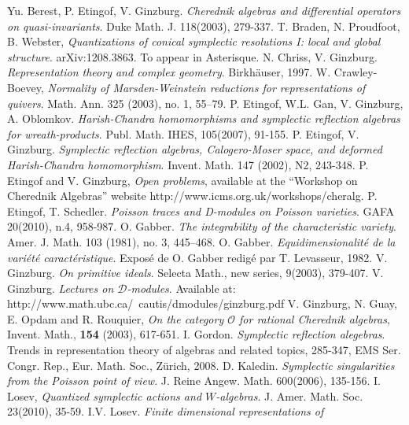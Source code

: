 \documentclass[12pt]{amsart}
\theoremstyle{definition}
\begin{document}
\begin{thebibliography}{99}
 Yu. Berest, P. Etingof, V. Ginzburg. {\it Cherednik algebras
and differential operators on quasi-invariants}.  Duke Math. J. 118(2003),  279-337.
 T. Braden, N. Proudfoot, B. Webster, {\it Quantizations of conical symplectic resolutions I: local and global structure}. arXiv:1208.3863. To appear in Asterisque.
 N. Chriss, V. Ginzburg. {\it Representation theory and complex geometry}.
Birkh\"{a}user, 1997.
 W. Crawley-Boevey, {\it Normality of Marsden-Weinstein reductions for representations of quivers}. Math. Ann.  325  (2003),  no. 1, 55–79.
 P. Etingof, W.L. Gan, V. Ginzburg, A. Oblomkov. {\it Harish-Chandra homomorphisms
and symplectic reflection algebras for wreath-products}. Publ. Math. IHES, 105(2007), 91-155.
 P. Etingof, V. Ginzburg. {\it Symplectic reflection algebras, Calogero-Moser space,
and deformed Harish-Chandra homomorphism}. Invent. Math. 147 (2002), N2, 243-348.
 P. Etingof and V. Ginzburg, {\it Open problems}, available at the “Workshop on Cherednik Algebras”
website http://www.icms.org.uk/workshops/cheralg.
 P. Etingof, T. Schedler. {\it Poisson traces and D-modules on Poisson varieties}. GAFA 20(2010), n.4,  958-987.
 O. Gabber. {\it The integrability of the characteristic variety}.
Amer. J. Math. 103 (1981), no. 3, 445–468.
 O. Gabber. {\it Equidimensionalit\'{e} de la vari\'{e}t\'{e} caract\'{e}ristique}. Expos\'{e} de O. Gabber redig\'{e} par T. Levasseur, 1982.
 V. Ginzburg. {\it On primitive ideals}. Selecta Math., new series, 9(2003), 379-407.
 V. Ginzburg. {\it Lectures on $\mathcal{D}$-modules}.
Available at: http://www.math.ubc.ca/~cautis/dmodules/ginzburg.pdf
 V. Ginzburg, N. Guay, E. Opdam and R. Rouquier, {\it On the category $\mathcal{O}$ for rational
Cherednik algebras}, Invent. Math., {\bf 154} (2003), 617-651.
 I. Gordon.  {\it Symplectic reflection alegebras}.  Trends in representation theory of algebras and related topics,  285-347, EMS Ser. Congr. Rep., Eur. Math. Soc., Zürich, 2008.
 D. Kaledin. {\it Symplectic singularities from the Poisson point of
view}. J. Reine Angew. Math. 600(2006), 135-156.
 I. Losev, {\it Quantized symplectic actions and $W$-algebras}.   J. Amer. Math. Soc. 23(2010), 35-59.
 I.V. Losev. {\it Finite dimensional representations of
}
\end{thebibliography}
\end{document}
